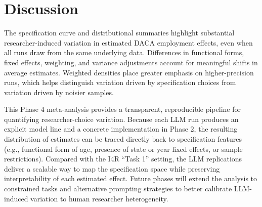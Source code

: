 \documentclass[11pt]{article}
\begin{document}
\begin{table}[htbp]
\centering
\caption{Shares of runs by estimation method, weighting, and variance adjustment}

\caption*{\textbf{Notes:} The table reports the number and share of valid runs using each estimation method, sample-weighting choice, and standard-error adjustment. ``Clustered (state)'' indicates cluster-robust standard errors with clustering at the state level. ``Robust (HC)'' includes heteroskedasticity-consistent variance estimators when specified. ``Other'' groups any estimation or weighting choices not labeled as OLS/WLS or PERWT.}
\label{tab:methods}
\end{table}

\begin{table}[htbp]
\centering
\caption{Mean effects by functional form of control variables}

\caption*{\textbf{Notes:} For each control variable, the table reports the mean and standard deviation of point estimates among specifications using that functional form. ``Fixed Effects'' indicates categorical controls (e.g., $C(\text{EDUC})$). ``Not included'' indicates that the control was omitted entirely from the specification.}
\label{tab:controls}
\end{table}

\begin{table}[htbp]
\centering
\caption{Summary statistics by LLM provider}

\caption*{\textbf{Notes:} Columns correspond to the Phase 1 LLM provider that generated each specification. Statistics are computed on the same filtered sample as Table~\ref{tab:summary}. The IQR is the 75th minus 25th percentile of point estimates within each provider.}
\label{tab:providers}
\end{table}

\section{Discussion}
The specification curve and distributional summaries highlight substantial researcher-induced variation in estimated DACA employment effects, even when all runs draw from the same underlying data. Differences in functional forms, fixed effects, weighting, and variance adjustments account for meaningful shifts in average estimates. Weighted densities place greater emphasis on higher-precision runs, which helps distinguish variation driven by specification choices from variation driven by noisier samples.

This Phase 4 meta-analysis provides a transparent, reproducible pipeline for quantifying researcher-choice variation. Because each LLM run produces an explicit model line and a concrete implementation in Phase 2, the resulting distribution of estimates can be traced directly back to specification features (e.g., functional form of age, presence of state or year fixed effects, or sample restrictions). Compared with the I4R ``Task 1'' setting, the LLM replications deliver a scalable way to map the specification space while preserving interpretability of each estimated effect. Future phases will extend the analysis to constrained tasks and alternative prompting strategies to better calibrate LLM-induced variation to human researcher heterogeneity.
\end{document}
